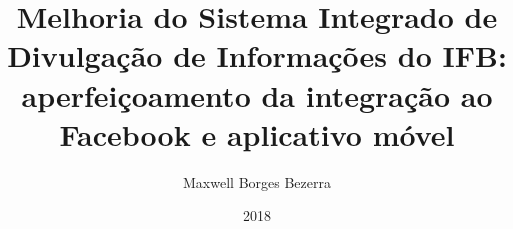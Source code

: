 \documentclass[pt,oneside,onehalfspacing,bsc]{ifbthesis}
\title{Melhoria do Sistema Integrado de Divulgação de Informações do IFB: aperfeiçoamento da integração ao Facebook e aplicativo móvel}
\date{2018}
\author{Maxwell Borges Bezerra}
\begin{document}
\frontmatter

\frontpage

\presentationpage

\begin{fichacatalografica}
    
\end{fichacatalografica}

\banca

\begin{dedicatory}
    
\end{dedicatory}

\acknowledgements


\gdef\resumoname{Resumo} 
{\parindent0pt
	
}

\abstract
{\parindent0pt
	
}

\listoffigures

\lstlistoflistings

\listoftables


\tableofcontents

\mainmatter










\begin{references}
  
\end{references}


\theappendix

\end{document}
